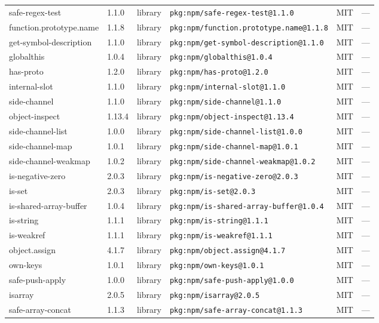 \documentclass[11pt]{article}
\begin{document}
\begin{longtable}{|l|l|l|p{2.2cm}|l|p{4cm}|}
safe-regex-test & 1.1.0 & library & \texttt{pkg:npm/safe-regex-test@1.1.0} & MIT & — \\
function.prototype.name & 1.1.8 & library & \texttt{pkg:npm/function.prototype.name@1.1.8} & MIT & — \\
get-symbol-description & 1.1.0 & library & \texttt{pkg:npm/get-symbol-description@1.1.0} & MIT & — \\
globalthis & 1.0.4 & library & \texttt{pkg:npm/globalthis@1.0.4} & MIT & — \\
has-proto & 1.2.0 & library & \texttt{pkg:npm/has-proto@1.2.0} & MIT & — \\
internal-slot & 1.1.0 & library & \texttt{pkg:npm/internal-slot@1.1.0} & MIT & — \\
side-channel & 1.1.0 & library & \texttt{pkg:npm/side-channel@1.1.0} & MIT & — \\
object-inspect & 1.13.4 & library & \texttt{pkg:npm/object-inspect@1.13.4} & MIT & — \\
side-channel-list & 1.0.0 & library & \texttt{pkg:npm/side-channel-list@1.0.0} & MIT & — \\
side-channel-map & 1.0.1 & library & \texttt{pkg:npm/side-channel-map@1.0.1} & MIT & — \\
side-channel-weakmap & 1.0.2 & library & \texttt{pkg:npm/side-channel-weakmap@1.0.2} & MIT & — \\
is-negative-zero & 2.0.3 & library & \texttt{pkg:npm/is-negative-zero@2.0.3} & MIT & — \\
is-set & 2.0.3 & library & \texttt{pkg:npm/is-set@2.0.3} & MIT & — \\
is-shared-array-buffer & 1.0.4 & library & \texttt{pkg:npm/is-shared-array-buffer@1.0.4} & MIT & — \\
is-string & 1.1.1 & library & \texttt{pkg:npm/is-string@1.1.1} & MIT & — \\
is-weakref & 1.1.1 & library & \texttt{pkg:npm/is-weakref@1.1.1} & MIT & — \\
object.assign & 4.1.7 & library & \texttt{pkg:npm/object.assign@4.1.7} & MIT & — \\
own-keys & 1.0.1 & library & \texttt{pkg:npm/own-keys@1.0.1} & MIT & — \\
safe-push-apply & 1.0.0 & library & \texttt{pkg:npm/safe-push-apply@1.0.0} & MIT & — \\
isarray & 2.0.5 & library & \texttt{pkg:npm/isarray@2.0.5} & MIT & — \\
safe-array-concat & 1.1.3 & library & \texttt{pkg:npm/safe-array-concat@1.1.3} & MIT & — \\

\end{longtable}
\end{document}
